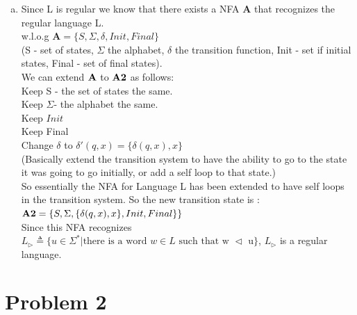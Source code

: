 \documentclass[11pt,leqno,fleqn]{article}
\begin{document}
\begin{enumerate}[(a)]
\item
Since L is regular we know that there exists a NFA $\mathbf{A}$ that recognizes the regular language L.\\
w.l.o.g $\mathbf{A} = \{ S , \Sigma, \delta, Init, Final \}$\\
 (S - set of states, $\Sigma$ the alphabet, $\delta$ the transition function, Init - set if initial states, Final - set of final states).\\
 
 We can extend $\bold{A}$ to $\bold{A2}$ as follows:\\
Keep S - the set of states the same.\\
Keep $\Sigma$- the alphabet the same.\\
Keep $Init$\\
Keep Final\\
Change $\delta$ to $\delta'(q,x) = \{\delta(q,x),x\}$\\
(Basically extend the transition system to have the ability to go to the state it was going to go initially, or add a self loop to that state.)\\
So essentially the NFA for Language L has been extended to have self loops in the transition system.
So the new transition state is :\\
$\bold{A2} = \{ S, \Sigma,\{\delta(q,x),x\},Init,Final \} \} $\\
Since this NFA recognizes $L_{\triangleright} \triangleq \{ u \in \Sigma^* | \text{there is a word $w \in L$ such that w $\triangleleft$ u}\}$, $L_{\triangleright}$ is a regular language.
\end{enumerate}

\newpage
\section{Problem 2}
\end{document}
